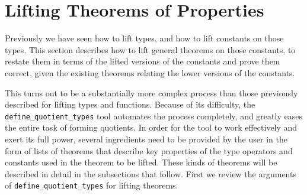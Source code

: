 \documentclass[envcountsame,runningheads]{llncs}
\begin{document}
%


%
\section{Lifting Theorems of Properties}
%
\label{liftingtheorems}

Previously we have seen how to lift types, and how to lift constants
on those types.  This section describes how to lift
general theorems
on those constants,
to restate them in terms of the lifted versions of
the constants and prove them correct,
given the existing theorems relating the lower versions of the constants.

This turns out to be a substantially more complex process than
those previously described for lifting types and functions. 
Because of its difficulty, the {\tt define\_quotient\_types} tool
automates the process completely,
and greatly eases the entire task of forming quotients.
In order for the tool to work effectively and
exert its full power, several ingredients need to be provided
by the user in the form of lists of theorems that describe
key properties of the type operators and constants used
in the theorem to be lifted.  These kinds of theorems will be
described in detail in the subsections that follow.
First we
review the arguments of
{\tt define\_quotient\_types}
for lifting theorems.
\end{document}
